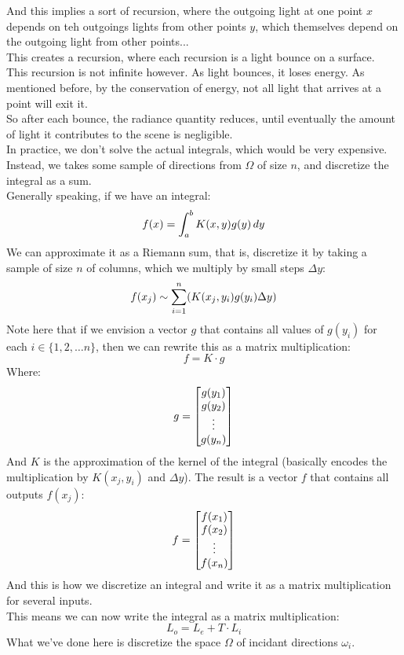 \documentclass[12pt]{article}
\begin{document}
And this implies a sort of recursion,
where the outgoing light at one point $x$
depends on teh outgoings lights from other points $y$,
which themselves depend on the outgoing light
from other points... \\
This creates a recursion, where each recursion
is a light bounce on a surface. \\

This recursion is not infinite however.
As light bounces, it loses energy.
As mentioned before, by the conservation of energy,
not all light that arrives at a point will exit it. \\
So after each bounce, the radiance quantity reduces,
until eventually the amount of light it contributes
to the scene is negligible. \\

In practice, we don't solve the actual integrals,
which would be very expensive.
Instead, we takes some sample of directions
from $\Omega$ of size $n$, 
and discretize the integral as a sum. \\

Generally speaking, if we have an integral:
\[ f(x) = \int_{a}^{b} K(x, y)g(y) \, dy \]
We can approximate it as a Riemann sum,
that is, discretize it
by taking a sample of size $n$ of columns,
which we multiply by small steps $\Delta y$:
\[ f(x_j) \sim \sum_{i = 1}^{n} (K(x_j, y_i)g(y_i) \Delta y) \]
Note here that if we envision
a vector $g$ that contains all values of $g(y_i)$
for each $i \in \{1, 2, \dots n\}$,
then we can rewrite this as a matrix multiplication:
\[ f = K \cdot g \]
Where:
\[ g = \begin{bmatrix} g(y_1) \\ g(y_2) \\ \vdots \\ g(y_n) \end{bmatrix} \]
And $K$ is the approximation of the kernel of the
integral (basically encodes the multiplication
by $K(x_j, y_i)$ and $\Delta y$).
The result is a vector $f$ that contains
all outputs $f(x_j)$:
\[ f = \begin{bmatrix} f(x_1) \\ f(x_2) \\ \vdots \\ f(x_n) \end{bmatrix} \]
And this is how we discretize an integral and write
it as a matrix multiplication for several inputs. \\

This means we can now write the integral
as a matrix multiplication:
\[ L_o = L_e + T \cdot L_i \]
What we've done here is discretize the space $\Omega$ of
incidant directions $\omega_i$. \\
\end{document}
